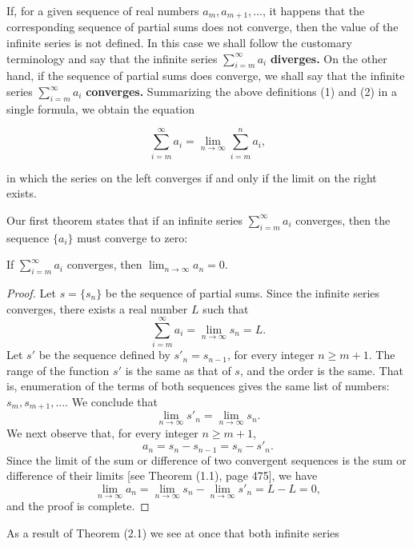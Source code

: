If, for a given sequence of real numbers $a_m, a_{m+1}, . . .$, it happens that the corresponding sequence of partial sums does not converge, then the value of the infinite series is not defined. In this case we shall follow the customary terminology and say that the infinite series $\sum_{i=m}^\infty a_i$ \textbf{diverges.} On the other hand, if the sequence of partial sums does converge, we shall say that the infinite series $\sum_{i=m}^\infty a_i$ \textbf{converges.} Summarizing the above definitions (1) and (2) in a single formula, we obtain the equation

\begin{equation}
\sum_{i=m}^\infty a_i = \lim_{n \rightarrow \infty} \sum_{i=m}^n a_i,  
\label{eq9.2.3}
\end{equation}

\noindent in which the series on the left converges if and only if the limit on the right exists.

Our first theorem states that if an infinite series $\sum_{i=m}^\infty a_i$ converges, then the sequence $\{ a_i \}$ must converge to zero:

\begin{theorem} %
If $\sum_{i=m}^\infty a_i$ converges, then $\lim_{n \rightarrow \infty} a_n  = 0.$
\end{theorem}

\begin{proof}
Let $s = \{ s_n \}$ be the sequence of partial sums. Since the infinite series converges, there exists a real number $L$ such that
$$
\sum_{i=m}^\infty a_i = \lim_{n \rightarrow \infty} s_n = L.
$$
Let $s'$ be the sequence defined by $s'_n = s_{n-1}$, for every integer $n \geq m + 1$. The range of the function $s'$ is the same as that of $s$, and the order is the same. That is, enumeration of the terms of both sequences gives the same list of numbers: $s_m, s_{m+1}, ....$ We conclude that 
$$
\lim_{n \rightarrow \infty} s'_n = \lim_{n \rightarrow \infty} s_n. 
$$
We next observe that, for every integer $n \geq m + 1$, 
$$
a_n = s_n - s_{n-1} = s_n - s'_n.
$$
Since the limit of the sum or difference of two convergent sequences is the sum or difference of their limits [see Theorem (1.1), page 475], we have 
$$
\lim_{n \rightarrow \infty} a_n = \lim_{n \rightarrow \infty} s_n - \lim_{n \rightarrow \infty} s'_n = L - L = 0,  
$$
and the proof is complete.
\end{proof}

As a result of Theorem (2.1) we see at once that both infinite series 
 

